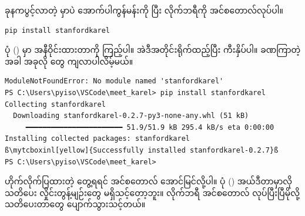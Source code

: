 \begin{figure}[tbh!]
\caption{} 
\label{fig:mtkrlfstrun}
\end{figure}
ခုနကပွင့်လာတဲ့  မှာပဲ အောက်ပါကွန်မန်းကို  ပြီး  လိုက်ဘရီကို အင်စတောလ်လုပ်ပါ။ 
%
\begin{verbatim}
pip install stanfordkarel
\end{verbatim}
%
ပုံ (\fRefNo{\ref{fig:mtkrlfstrun}}) မှာ အနီဝိုင်းထားတာကို ကြည့်ပါ။ အဲဒီအတိုင်းရိုက်ထည့်ပြီး  ကီးနှိပ်ပါ။ ခဏကြာတဲ့အခါ အခုလို တွေ ကျလာပါလိမ့်မယ်။ 

%
\begin{verbatim}
ModuleNotFoundError: No module named 'stanfordkarel'
PS C:\Users\pyiso\VSCode\meet_karel> pip install stanfordkarel
Collecting stanfordkarel
  Downloading stanfordkarel-0.2.7-py3-none-any.whl (51 kB)
     ━━━━━━━━━━━━━━━━━━━━━━━ 51.9/51.9 kB 295.4 kB/s eta 0:00:00
Installing collected packages: stanfordkarel
ß\mytcboxinl[yellow]{Successfully installed stanfordkarel-0.2.7}ß
PS C:\Users\pyiso\VSCode\meet_karel> 
\end{verbatim}
%
ဟိုက်လိုက်ပြထားတဲ့  တွေ့ရရင် အင်စတောလ် အောင်မြင်လို့ပါ။ ပုံ (\fRefNo{\ref{fig:edtmtkrl}}) အယ်ဒီတာမှာလို သတိပေး လှိုင်းတွန့်မျဉ်းတွေ မရှိသင့်တော့ဘူး။  လိုက်ဘရီ အင်စတောလ် လုပ်ပြီးပြီမိုလို့ သတိပေးတာတွေ ပျောက်သွားသင့်တယ်။



